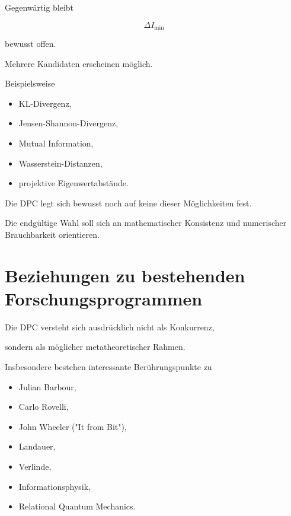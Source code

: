\documentclass[11pt,a4paper]{article}
\begin{document}
Gegenwärtig bleibt

\[
\Delta I_{\min}
\]

bewusst offen.

Mehrere Kandidaten erscheinen möglich.

Beispielsweise

\begin{itemize}

\item KL-Divergenz,

\item Jensen-Shannon-Divergenz,

\item Mutual Information,

\item Wasserstein-Distanzen,

\item projektive Eigenwertabstände.

\end{itemize}

Die DPC legt sich bewusst noch
auf keine dieser Möglichkeiten fest.

Die endgültige Wahl soll sich
an mathematischer Konsistenz
und numerischer Brauchbarkeit orientieren.

\section{Beziehungen zu bestehenden Forschungsprogrammen}

Die DPC versteht sich ausdrücklich
nicht als Konkurrenz,

sondern als möglicher metatheoretischer Rahmen.

Insbesondere bestehen interessante Berührungspunkte zu

\begin{itemize}

\item Julian Barbour,

\item Carlo Rovelli,

\item John Wheeler ("It from Bit"),

\item Landauer,

\item Verlinde,

\item Informationsphysik,

\item Relational Quantum Mechanics.

\end{itemize}
\end{document}
